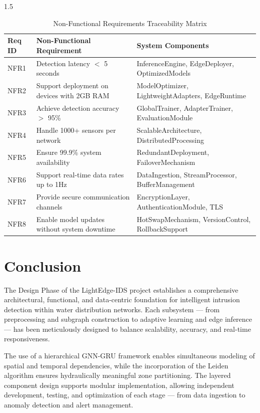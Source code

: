 \begin{spacing}{1.5}
\begin{table}[H]
\centering
\small
\begin{tabularx}{\textwidth}{|l|X|X|}
\hline
\textbf{Req ID} & \textbf{Non-Functional Requirement} & \textbf{System Components} \\
\hline
NFR1 & Detection latency $<$ 5 seconds & InferenceEngine, EdgeDeployer, OptimizedModels \\
\hline
NFR2 & Support deployment on devices with 2GB RAM & ModelOptimizer, LightweightAdapters, EdgeRuntime \\
\hline
NFR3 & Achieve detection accuracy $>$ 95\% & GlobalTrainer, AdapterTrainer, EvaluationModule \\
\hline
NFR4 & Handle 1000+ sensors per network & ScalableArchitecture, DistributedProcessing \\
\hline
NFR5 & Ensure 99.9\% system availability & RedundantDeployment, FailoverMechanism \\
\hline
NFR6 & Support real-time data rates up to 1Hz & DataIngestion, StreamProcessor, BufferManagement \\
\hline
NFR7 & Provide secure communication channels & EncryptionLayer, AuthenticationModule, TLS \\
\hline
NFR8 & Enable model updates without system downtime & HotSwapMechanism, VersionControl, RollbackSupport \\
\hline
\end{tabularx}
\caption{Non-Functional Requirements Traceability Matrix}
\end{table}


\section{Conclusion}

The Design Phase of the LightEdge-IDS project establishes a comprehensive architectural, functional, and data-centric foundation for intelligent intrusion detection within water distribution networks. Each subsystem — from preprocessing and subgraph construction to adaptive learning and edge inference — has been meticulously designed to balance scalability, accuracy, and real-time responsiveness.

The use of a hierarchical GNN-GRU framework enables simultaneous modeling of spatial and temporal dependencies, while the incorporation of the Leiden algorithm ensures hydraulically meaningful zone partitioning. The layered component design supports modular implementation, allowing independent development, testing, and optimization of each stage — from data ingestion to anomaly detection and alert management.


\end{spacing}
